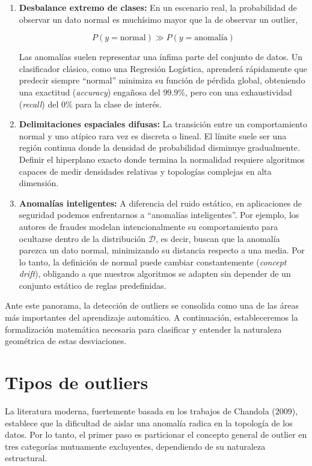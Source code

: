 \begin{enumerate}
	\item \textbf{Desbalance extremo de clases:} En un escenario real, la probabilidad de observar un dato normal es muchísimo mayor que la de observar un outlier,
	
	\[
	P(y=\text{normal}) \gg P(y=\text{anomalía})
	\]
	
	Las anomalías suelen representar una ínfima parte del conjunto de datos. Un clasificador clásico, como una Regresión Logística, aprenderá rápidamente que predecir siempre ``normal'' minimiza su función de pérdida global, obteniendo una exactitud (\textit{accuracy}) engañosa del $99.9\%$, pero con una exhaustividad (\textit{recall}) del $0\%$ para la clase de interés.
	
	\item \textbf{Delimitaciones espaciales difusas:} La transición entre un comportamiento normal y uno atípico rara vez es discreta o lineal. El límite suele ser una región continua donde la densidad de probabilidad disminuye gradualmente. Definir el hiperplano exacto donde termina la normalidad requiere algoritmos capaces de medir densidades relativas y topologías complejas en alta dimensión.
	
	\item \textbf{Anomalías inteligentes:} A diferencia del ruido estático, en aplicaciones de seguridad podemos enfrentarnos a ``anomalías inteligentes''. Por ejemplo, los autores de fraudes modelan intencionalmente su comportamiento para ocultarse dentro de la distribución $\mathcal{D}$, es decir, buscan que la anomalía parezca un dato normal, minimizando su distancia respecto a una media. Por lo tanto, la definición de normal puede cambiar constantemente (\textit{concept drift}), obligando a que nuestros algoritmos se adapten sin depender de un conjunto estático de reglas predefinidas.
\end{enumerate}

Ante este panorama, la detección de outliers se consolida como una de las áreas más importantes del aprendizaje automático. A continuación, estableceremos la formalización matemática necesaria para clasificar y entender la naturaleza geométrica de estas desviaciones.

\section{Tipos de outliers}

La literatura moderna, fuertemente basada en los trabajos de Chandola (2009), establece que la dificultad de aislar una anomalía radica en la topología de los datos. Por lo tanto, el primer paso es particionar el concepto general de outlier en tres categorías mutuamente excluyentes, dependiendo de su naturaleza estructural.

